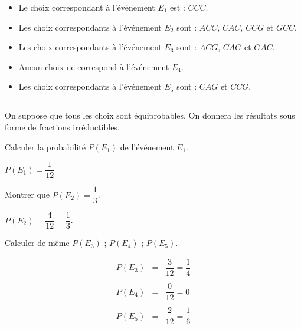 \begin{questions}
	\begin{solution}
		\begin{itemize}
			\item Le choix correspondant à l'événement $E_1$ est : $CCC$.
			\item Les choix correspondants à l'événement $E_2$ sont : $ACC$, $CAC$, $CCG$ et $GCC$.
			\item Les choix correspondants à l'événement $E_3$ sont : $ACG$, $CAG$ et $GAC$.
			\item Aucun choix ne correspond à l'événement $E_4$.
			\item Les choix correspondants à l'événement $E_5$ sont : $CAG$ et $CCG$.
		\end{itemize}
	\end{solution}
\end{questions}

\subsection{}

On suppose que tous les choix sont équiprobables. On donnera les résultats sous forme de fractions irréductibles.

\begin{questions}
	\question[1] Calculer la probabilité $P(E_1)$ de l'événement $E_1$.
	\begin{solution}
		$P(E_1)=\dfrac{1}{12}$
	\end{solution}
	
	\question[1] Montrer que $P(E_2)=\dfrac{1}{3}$.
	 \begin{solution}
	 	$P(E_2)=\dfrac{4}{12}=\dfrac{1}{3}$.
	 \end{solution}
	
	\question[2] Calculer de même $P(E_3)$ ; $P(E_4)$ ; $P(E_5)$.
	\begin{solution}
		\begin{eqnarray*}
			P(E_3) &=& \dfrac{3}{12} = \dfrac{1}{4} \\
			 & & \\
			P(E_4) &=& \dfrac{0}{12} = 0 \\
			& & \\
			P(E_5) &=& \dfrac{2}{12} = \dfrac{1}{6} 
		\end{eqnarray*}
	\end{solution}
\end{questions} 